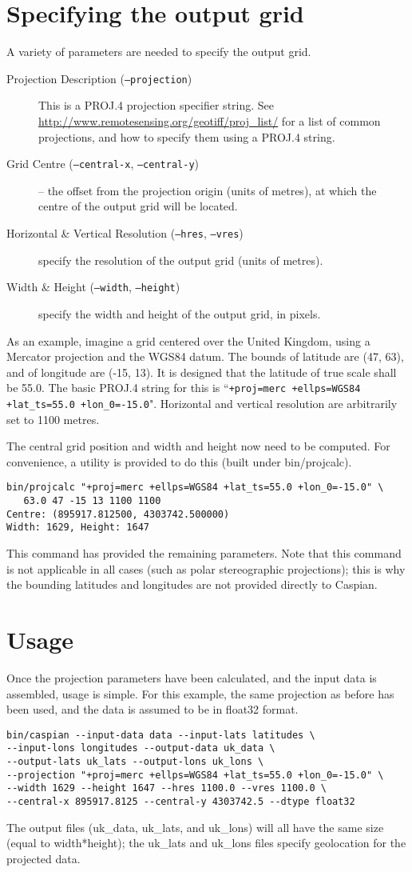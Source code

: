 \documentclass[a4paper,12pt]{article}
\begin{document}
\section{Specifying the output grid}
A variety of parameters are needed to specify the output grid.
\begin{description}
\item[Projection Description (\texttt{--projection})] This is a PROJ.4 projection specifier string. See \url{http://www.remotesensing.org/geotiff/proj_list/} for a list of common projections, and how to specify them using a PROJ.4 string.
\item[Grid Centre (\texttt{--central-x}, \texttt{--central-y})] -- the offset from the projection origin (units of metres), at which the centre of the output grid will be located.
\item[Horizontal \& Vertical Resolution (\texttt{--hres}, \texttt{--vres})] specify the resolution of the output grid (units of metres).
\item[Width \& Height (\texttt{--width}, \texttt{--height})] specify the width and height of the output grid, in pixels.
\end{description}

As an example, imagine a grid centered over the United Kingdom, using a Mercator projection and the WGS84 datum. The bounds of latitude are (47, 63), and of longitude are (-15, 13). It is designed that the latitude of true scale shall be 55.0. The basic PROJ.4 string for this is ``\texttt{+proj=merc +ellps=WGS84 +lat\_ts=55.0 +lon\_0=-15.0}". Horizontal and vertical resolution are arbitrarily set to 1100 metres.

The central grid position and width and height now need to be computed. For convenience, a utility is provided to do this (built under bin/projcalc).
\begin{verbatim}
bin/projcalc "+proj=merc +ellps=WGS84 +lat_ts=55.0 +lon_0=-15.0" \
   63.0 47 -15 13 1100 1100
Centre: (895917.812500, 4303742.500000)
Width: 1629, Height: 1647
\end{verbatim}
This command has provided the remaining parameters. Note that this command is not applicable in all cases (such as polar stereographic projections); this is why the bounding latitudes and longitudes are not provided directly to Caspian.

\section{Usage}
Once the projection parameters have been calculated, and the input data is assembled, usage is simple. For this example, the same projection as before has been used, and the data is assumed to be in float32 format.
\begin{verbatim}
bin/caspian --input-data data --input-lats latitudes \
--input-lons longitudes --output-data uk_data \
--output-lats uk_lats --output-lons uk_lons \
--projection "+proj=merc +ellps=WGS84 +lat_ts=55.0 +lon_0=-15.0" \
--width 1629 --height 1647 --hres 1100.0 --vres 1100.0 \
--central-x 895917.8125 --central-y 4303742.5 --dtype float32
\end{verbatim}

The output files (uk\_data, uk\_lats, and uk\_lons) will all have the same size (equal to width*height); the uk\_lats and uk\_lons files specify geolocation for the projected data.
\end{document}
